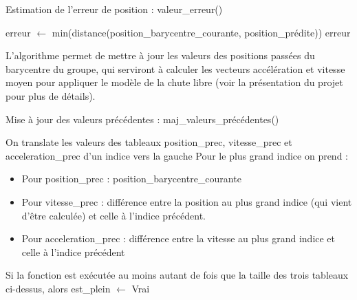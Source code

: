 \documentclass{article}
\begin{document}
\begin{algorithm}[H]
    \caption{Estimation de l'erreur de position : valeur\_erreur()}
    \begin{algorithmic}

        \STATE erreur $\leftarrow$ min(distance(position\_barycentre\_courante, position\_prédite))
        \RETURN erreur

    \end{algorithmic}
\end{algorithm}

L'algorithme permet de mettre à jour les valeurs des positions passées du barycentre du groupe, qui serviront à calculer les vecteurs accélération et vitesse moyen pour appliquer le modèle de la chute libre (voir la présentation du projet pour plus de détails).
\begin{algorithm}[H]
    \caption{Mise à jour des valeurs précédentes : maj\_valeurs\_précédentes()}
    \begin{algorithmic}

        \STATE On translate les valeurs des tableaux position\_prec, vitesse\_prec et acceleration\_prec d'un indice vers la gauche
        \STATE Pour le plus grand indice on prend :
        \begin{itemize}
            \item Pour position\_prec : position\_barycentre\_courante
            \item Pour vitesse\_prec : différence entre la  position au plus grand indice (qui vient d’être calculée)  et celle à l’indice précédent.
            \item Pour acceleration\_prec : différence entre la vitesse au plus grand indice et celle à l’indice précédent
        \end{itemize}

        \STATE Si la fonction est exécutée au moins autant de fois que la taille des trois tableaux ci-dessus, alors est\_plein $\leftarrow$ Vrai


    \end{algorithmic}
\end{algorithm}
\end{document}
